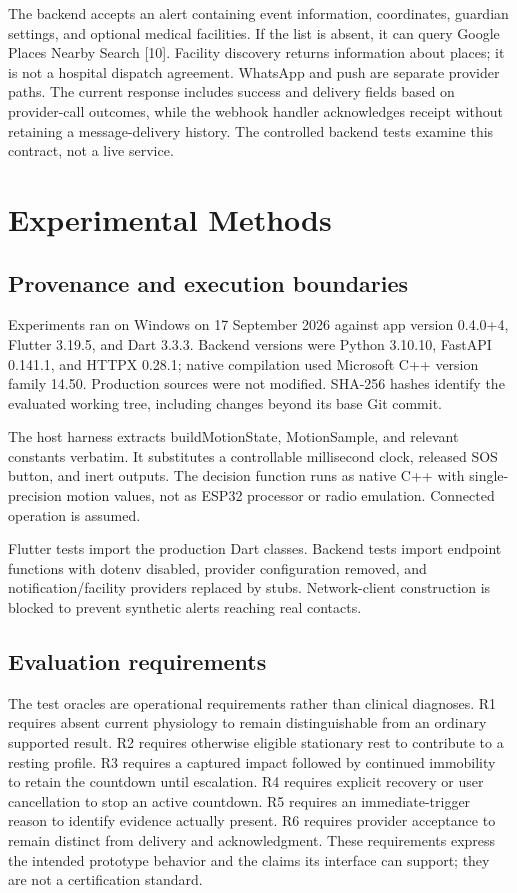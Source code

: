 \documentclass[journal]{IEEEtran}
\begin{document}
The backend accepts an alert containing event information, coordinates, guardian settings, and optional medical facilities. If the list is absent, it can query Google Places Nearby Search [10]. Facility discovery returns information about places; it is not a hospital dispatch agreement. WhatsApp and push are separate provider paths. The current response includes success and delivery fields based on provider-call outcomes, while the webhook handler acknowledges receipt without retaining a message-delivery history. The controlled backend tests examine this contract, not a live service.

\section{Experimental Methods}
\subsection{Provenance and execution boundaries}
Experiments ran on Windows on 17 September 2026 against app version 0.4.0+4, Flutter 3.19.5, and Dart 3.3.3. Backend versions were Python 3.10.10, FastAPI 0.141.1, and HTTPX 0.28.1; native compilation used Microsoft C++ version family 14.50. Production sources were not modified. SHA-256 hashes identify the evaluated working tree, including changes beyond its base Git commit.

The host harness extracts buildMotionState, MotionSample, and relevant constants verbatim. It substitutes a controllable millisecond clock, released SOS button, and inert outputs. The decision function runs as native C++ with single-precision motion values, not as ESP32 processor or radio emulation. Connected operation is assumed.

Flutter tests import the production Dart classes. Backend tests import endpoint functions with dotenv disabled, provider configuration removed, and notification/facility providers replaced by stubs. Network-client construction is blocked to prevent synthetic alerts reaching real contacts.

\subsection{Evaluation requirements}
The test oracles are operational requirements rather than clinical diagnoses. R1 requires absent current physiology to remain distinguishable from an ordinary supported result. R2 requires otherwise eligible stationary rest to contribute to a resting profile. R3 requires a captured impact followed by continued immobility to retain the countdown until escalation. R4 requires explicit recovery or user cancellation to stop an active countdown. R5 requires an immediate-trigger reason to identify evidence actually present. R6 requires provider acceptance to remain distinct from delivery and acknowledgment. These requirements express the intended prototype behavior and the claims its interface can support; they are not a certification standard.
\end{document}
